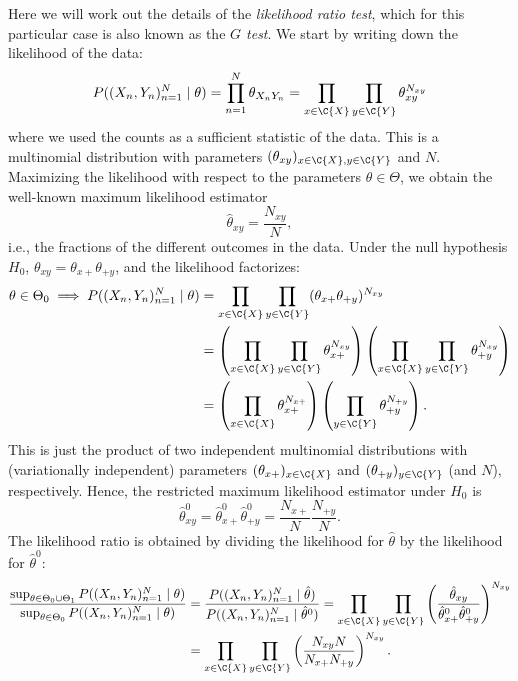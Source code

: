 Here we will work out the details of the \emph{likelihood ratio test}, which for this particular case
is also known as the \emph{$G$ test}. We start by writing down the likelihood of the data:
$$P((X_n,Y_n)_{n=1}^N \mid \theta) = \prod_{n=1}^N \theta_{X_nY_n} = \prod_{x\in\C{X}} \prod_{y\in\C{Y}} \theta_{xy}^{N_{xy}}$$
where we used the counts as a sufficient statistic of the data. 
This is a multinomial distribution with parameters $(\theta_{xy})_{x\in\C{X},y\in\C{Y}}$ and $N$.
Maximizing the likelihood with respect to the parameters $\theta \in \Theta$, we obtain the well-known maximum likelihood estimator
$$\hat \theta_{xy} = \frac{N_{xy}}{N},$$
i.e., the fractions of the different outcomes in the data.
Under the null hypothesis $H_0$, $\theta_{xy} = \theta_{x+}\theta_{+ y}$, and the likelihood factorizes:
\begin{equation*}\begin{split}
  \theta \in \Theta_0 \implies P((X_n,Y_n)_{n=1}^N \mid \theta) 
  &= \prod_{x\in\C{X}} \prod_{y\in\C{Y}} (\theta_{x+} \theta_{+ y})^{N_{xy}} \\
  &= \left(\prod_{x\in\C{X}} \prod_{y\in\C{Y}} \theta_{x+}^{N_{xy}} \right) \left(\prod_{x\in\C{X}} \prod_{y\in\C{Y}} \theta_{+ y}^{N_{xy}}\right) \\
  &= \left(\prod_{x\in\C{X}} \theta_{x+}^{N_{x+}} \right) \left(\prod_{y\in\C{Y}} \theta_{+ y}^{N_{+ y}}\right).
\end{split}\end{equation*}
This is just the product of two independent multinomial distributions with (variationally independent) parameters
$(\theta_{x+})_{x\in\C{X}}$ and $(\theta_{+ y})_{y\in\C{Y}}$ (and $N$), respectively.
Hence, the restricted maximum likelihood estimator under $H_0$ is 
$$\hat \theta^0_{xy} = \hat \theta^0_{x+} \hat \theta^0_{+ y} = \frac{N_{x+}}{N} \frac{N_{+ y}}{N}.$$
The likelihood ratio is obtained by dividing the likelihood for $\hat \theta$ by the likelihood for $\hat \theta^0$:
\begin{equation}\label{eq:indep_test_XY_likelihood_ratio}\begin{split}
\frac{\sup_{\theta\in\Theta_0\cup\Theta_1} P((X_n,Y_n)_{n=1}^N \mid \theta)}{\sup_{\theta\in\Theta_0} P((X_n,Y_n)_{n=1}^N \mid \theta)}
  & = \frac{P((X_n,Y_n)_{n=1}^N \mid \hat\theta)}{P((X_n,Y_n)_{n=1}^N \mid \hat\theta^0)}
    = \prod_{x\in\C{X}} \prod_{y\in\C{Y}} \left(\frac{\hat \theta_{xy}}{\hat \theta^0_{x+} \hat \theta^0_{+ y}}\right)^{N_{xy}} \\
  & = \prod_{x\in\C{X}} \prod_{y\in\C{Y}} \left(\frac{N_{xy} N}{N_{x+} N_{+ y}}\right)^{N_{xy}}.
\end{split}\end{equation}
